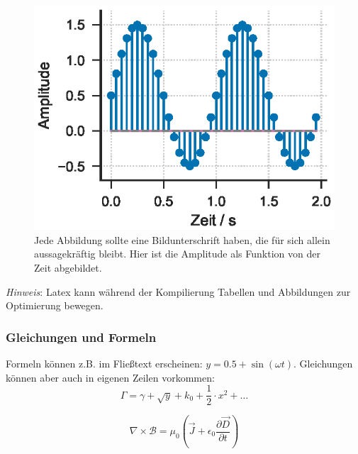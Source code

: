 \begin{figure}[h] 
  \centering
  \includegraphics[scale=1]{bilder/example_signal} %
  \caption{Jede Abbildung sollte eine Bildunterschrift haben, die für sich allein aussagekräftig bleibt. Hier ist die Amplitude als Funktion von der Zeit abgebildet.}
  \label{fig:somesignal}
\end{figure}

\emph{Hinweis}: Latex kann während der Kompilierung Tabellen und Abbildungen zur Optimierung bewegen.

\subsubsection{Gleichungen und Formeln}
Formeln können z.B. im Fließtext erscheinen: $y = 0.5 + \sin (\omega t)$. Gleichungen können aber auch in eigenen Zeilen vorkommen:
\begin{equation*}
    \label{simple_equation} 
    \Gamma = \gamma + \sqrt{ y } + k_0 + \frac{1}{2} \cdot x^2 + \dots
\end{equation*}

\begin{equation}
    \label{complex_equation} 
    \nabla \times \mathcal{B} = 
    \mu_0 \left( \vec{J} + \epsilon_0 \frac{\partial\vec{D}}{\partial t} \right)
\end{equation}

